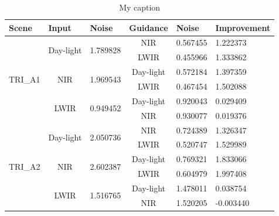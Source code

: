 \documentclass[10pt,twocolumn,letterpaper]{article}
\begin{document}
\begin{table}[]
	\centering
	\caption{My caption}
	\label{my-label}
	\begin{tabular}{@{}lccccl@{}}
		\toprule
		Scene                    & \multicolumn{1}{l}{Input}  & \multicolumn{1}{l}{Noise} & \multicolumn{1}{l}{Guidance} & \multicolumn{1}{l}{Noise} & Improvement \\ \midrule
		\multirow{6}{*}{TRI\_A1} & \multirow{2}{*}{Day-light} & \multirow{2}{*}{1.789828} & NIR                          & 0.567455                  & 1.222373    \\
		&                            &                           & LWIR                         & 0.455966                  & 1.333862    \\
		& \multirow{2}{*}{NIR}       & \multirow{2}{*}{1.969543} & Day-light                    & 0.572184                  & 1.397359    \\
		&                            &                           & LWIR                         & 0.467454                  & 1.502088    \\
		& \multirow{2}{*}{LWIR}      & \multirow{2}{*}{0.949452} & Day-light                    & 0.920043                  & 0.029409    \\
		&                            &                           & NIR                          & 0.930077                  & 0.019376    \\ \midrule
		\multirow{6}{*}{TRI\_A2} & \multirow{2}{*}{Day-light} & \multirow{2}{*}{2.050736} & NIR                          & 0.724389                  & 1.326347    \\
		&                            &                           & LWIR                         & 0.520747                  & 1.529989    \\
		& \multirow{2}{*}{NIR}       & \multirow{2}{*}{2.602387} & Day-light                    & 0.769321                  & 1.833066    \\
		&                            &                           & LWIR                         & 0.604979                  & 1.997408    \\
		& \multirow{2}{*}{LWIR}      & \multirow{2}{*}{1.516765} & Day-light                    & 1.478011                  & 0.038754    \\
		&                            &                           & NIR                          & 1.520205                  & -0.003440   \\ \midrule

\end{tabular}
\end{table}
\end{document}
